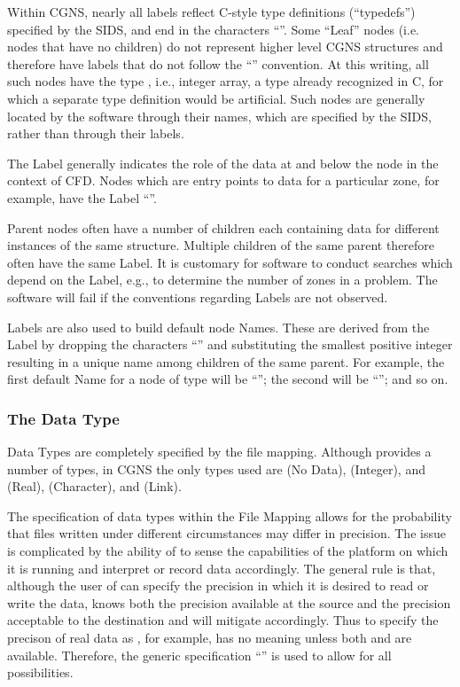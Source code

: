 Within CGNS, nearly all labels reflect C-style type definitions
(``typedefs'') specified by the SIDS, and end in the characters
``''. Some ``Leaf'' nodes (i.e. nodes that have no children)
do not represent higher level CGNS structures and therefore have labels
that do not follow the ``'' convention. At this writing, all
such nodes have the type , i.e., integer array, a type
already recognized in C, for which a separate type definition would be
artificial. Such nodes are generally located by the software through
their names, which are specified by the SIDS, rather than through their
labels.

The Label generally indicates the role of the data at and below the
node in the context of CFD. Nodes which are entry points to data for a
particular zone, for example, have the Label ``''.

Parent nodes often have a number of children each containing data for
different instances of the same structure. Multiple children of the same
parent therefore often have the same Label. It is customary for software
to conduct searches which depend on the Label, e.g., to determine the
number of zones in a problem. The software will fail if the conventions
regarding Labels are not observed.

Labels are also used to build default node Names. These are derived from
the Label by dropping the characters ``'' and substituting the
smallest positive integer resulting in a unique name among children
of the same parent. For example, the first default Name for a node
of type  will be ``''; the second will be
``''; and so on.

\subsubsection{The Data Type}

Data Types are completely specified by the file mapping. Although \HDF
provides a number of types, in CGNS the only types used are 
(No Data),  (Integer),  and  (Real),
 (Character), and  (Link).

%
The specification of data types within the File Mapping allows for the
probability that files written under different circumstances may differ
in precision. The issue is complicated by the ability of \HDF to sense
the capabilities of the platform on which it is running and interpret or
record data accordingly. The general rule is that, although the user of
\HDF can specify the precision in which it is desired to read or write
the data, \HDF knows both the precision available at the source and the
precision acceptable to the destination and will mitigate accordingly.
Thus to specify the precison of real data as , for example, has
no meaning unless both  and  are available. Therefore,
the generic specification ``'' is used to allow for all
possibilities.

